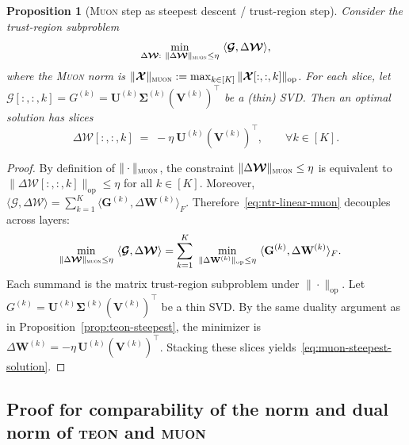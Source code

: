 \documentclass{article}
\newcommand{\ten}[1]{\bm{\mathcal{#1}}}
\newcommand{\mat}[1]{\mathbf{#1}}
\theoremstyle{plain}
\newtheorem{proposition}[theorem]{Proposition}
\theoremstyle{definition}
\theoremstyle{remark}
\begin{document}
\begin{proposition}[\textsc{Muon} step as steepest descent / trust-region step]
\label{prop:muon-steepest}
Consider the trust-region subproblem
\begin{equation}
\label{eq:ntr-linear-muon}
\min_{\Delta \ten{W}:\ \|\Delta \ten{W}\|_{\textsc{muon}}\le \eta}
\ \langle \ten{G},\Delta \ten{W} \rangle,
\end{equation}
where the \textsc{Muon} norm is
$\|\ten{X}\|_{\textsc{muon}}:=\max_{k\in[K]}\|\ten{X}[:,:, k]\|_{\mathrm{op}}$.
For each slice, let $\ten{G}[:,:, k]=G^{(k)}=\mat{U}^{(k)}\mat{\Sigma}^{(k)}(\mat{V}^{(k)})^\top$
be a (thin) SVD. Then an optimal solution has slices
\begin{equation}
\label{eq:muon-steepest-solution}
\Delta \ten{W}[:,:, k]
\;=\;
-\eta\ \mat{U}^{(k)}(\mat{V}^{(k)})^\top,
\qquad \forall k\in[K].
\end{equation}
\end{proposition}

\begin{proof}
By definition of $\|\cdot\|_{\textsc{muon}}$, the constraint $\|\Delta \ten{W}\|_{\textsc{muon}}\le\eta$ is equivalent to
$\|\Delta \ten{W}[:,:, k]\|_{\mathrm{op}}\le \eta$ for all $k\in[K]$. Moreover,
$\langle \ten{G},\Delta \ten{W}\rangle=\sum_{k=1}^K\langle \mat{G}^{(k)},\Delta \mat{W}^{(k)}\rangle_F$.
Therefore~\eqref{eq:ntr-linear-muon} decouples across layers:
\begin{align}
\min_{\|\Delta \ten{W}\|_{\textsc{muon}}\le \eta}
\ \langle \ten{G},\Delta \ten{W}\rangle
&=
\sum_{k=1}^K\
\min_{\|\Delta \mat{W}^{(k)}\|_{\mathrm{op}}\le \eta}
\ \langle \mat{G}^{(k)},\Delta \mat{W}^{(k)}\rangle_F.
\label{eq:muon-proof-decouple}
\end{align}
Each summand is the matrix trust-region subproblem under $\|\cdot\|_{\mathrm{op}}$.
Let $G^{(k)}=\mat{U}^{(k)}\mat{\Sigma}^{(k)}(\mat{V}^{(k)})^\top$ be a thin SVD.
By the same duality argument as in Proposition~\ref{prop:teon-steepest}, the minimizer is
$\Delta \mat{W}^{(k)}=-\eta\,\mat{U}^{(k)}(\mat{V}^{(k)})^\top$.
Stacking these slices yields~\eqref{eq:muon-steepest-solution}.
\end{proof}


\subsection{Proof for comparability of the norm and dual norm of \textsc{teon} and \textsc{muon} }
\label{app:norm_comparability}
\end{document}

